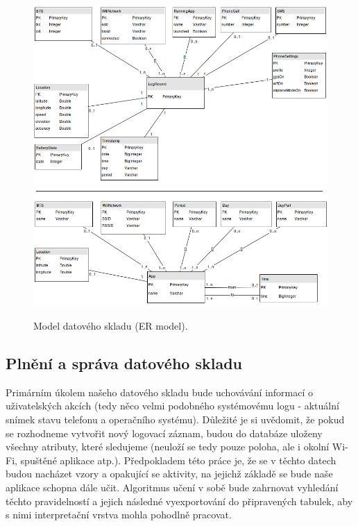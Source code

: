 \documentclass[thesis=M,czech]{FITthesis}[2012/06/26]
\begin{document}
\begin{figure}\centering
	\includegraphics[width=1\textwidth]{figures/er_model1}
	\includegraphics[width=1\textwidth]{figures/er_model2}
	\caption{Model datového skladu (ER model).}
	\label{fig:er_model}
\end{figure}

\subsection{Plnění a správa datového skladu}
Primárním úkolem našeho datového skladu bude uchovávání informací o uživatelských akcích (tedy něco velmi podobného systémovému logu - aktuální snímek stavu telefonu a operačního systému). Důležité je si uvědomit, že pokud se rozhodneme vytvořit nový logovací záznam, budou do databáze uloženy všechny atributy, které sledujeme (neuloží se tedy pouze poloha, ale i okolní Wi-Fi, spuštěné aplikace atp.). Předpokladem této práce je, že se v těchto datech budou nacházet vzory a opakující se aktivity, na jejichž základě se bude naše aplikace schopna dále učit. Algoritmus učení v sobě bude zahrnovat vyhledání těchto pravidelností a jejich následné vyexportování do připravených tabulek, aby s nimi interpretační vrstva mohla pohodlně pracovat.
\end{document}
